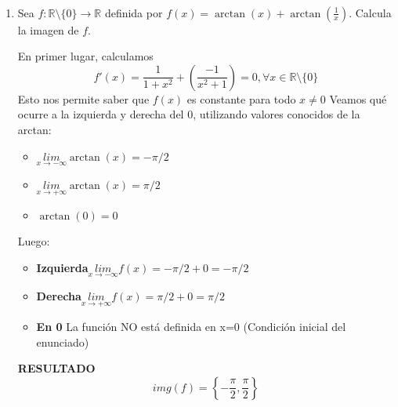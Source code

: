 \documentclass[12pt]{article}
\begin{document}
\newpage
\begin{ejercicio}\
\begin{enumerate}[label=\alph*)]
    \item Sea $f:\mathbb{R}\setminus \{0\}\longrightarrow \mathbb{R} $ definida por $f(x) = \arctan(x) + \arctan\left(\frac{1}{x}\right)$. Calcula la imagen de $f$.
           
    
    En primer lugar, calculamos $$f'(x) =  \frac1{1+x^2} + \left(\frac{-1}{x^2+1}\right) = 0, \forall x \in \mathbb{R}\setminus\{0\}$$
    Esto nos permite saber que $f(x)$ es constante para todo $x\neq 0$ \newline
    Veamos qué ocurre a la izquierda y derecha del 0, utilizando valores conocidos de la arctan:\begin{itemize}
        \item $\underset{x\to -\infty}{lim}\arctan(x)=-\pi/2$
        \item $\underset{x\to +\infty}{lim}\arctan(x)=\pi/2$
        \item $\arctan(0)=0$
    
    \end{itemize} 
    Luego: \begin{itemize}
        \item \textbf{Izquierda}$\underset{x\to -\infty}{lim} f(x)=-\pi/2 + 0 = -\pi/2$
        \item \textbf{Derecha}$\underset{x\to +\infty}{lim} f(x)=\pi/2 + 0 = \pi/2$
        \item \textbf{En 0} La función NO está definida en x=0 (Condición inicial del enunciado)
    \end{itemize}
    \textbf{RESULTADO} $$img(f) = \left\{-\frac\pi2, \frac\pi2\right\}$$

    \begin{center}
\end{center}
\end{enumerate}
\end{ejercicio}
\end{document}
